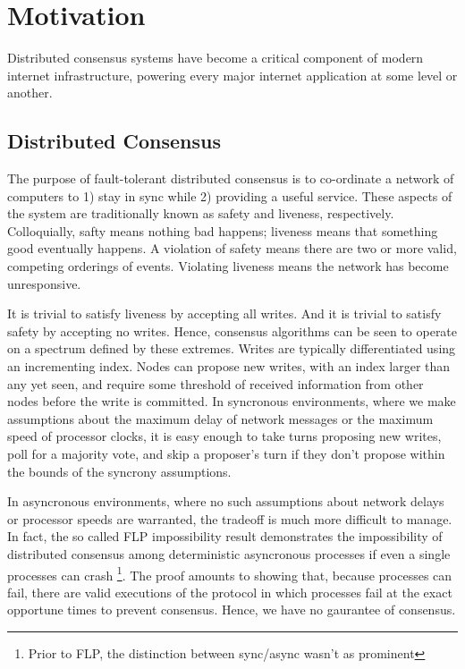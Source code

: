 \chapter{Motivation}

Distributed consensus systems have become a critical component of modern internet infrastructure, powering every major internet application at some level or another.

\section{Distributed Consensus}

The purpose of fault-tolerant distributed consensus is to co-ordinate a network of computers to 1) stay in sync while 2) providing a useful service.
These aspects of the system are traditionally known as safety and liveness, respectively.
Colloquially, safty means nothing bad happens; liveness means that something good eventually happens.
A violation of safety means there are two or more valid, competing orderings of events.
Violating liveness means the network has become unresponsive.

It is trivial to satisfy liveness by accepting all writes. And it is trivial to satisfy safety by accepting no writes.
Hence, consensus algorithms can be seen to operate on a spectrum defined by these extremes.
Writes are typically differentiated using an incrementing index.
Nodes can propose new writes, with an index larger than any yet seen,
and require some threshold of received information from other nodes before the write is committed.
In syncronous environments, where we make assumptions about the maximum delay of network messages or the maximum speed of processor clocks,
 it is easy enough to take turns proposing new writes, poll for a majority vote, 
and skip a proposer's turn if they don't propose within the bounds of the syncrony assumptions.

In asyncronous environments, where no such assumptions about network delays or processor speeds are warranted,
the tradeoff is much more difficult to manage.
In fact, the so called FLP impossibility result demonstrates the impossibility of distributed consensus among deterministic asyncronous processes if even a single processes can crash 
\footnote{Prior to FLP, the distinction between sync/async wasn't as prominent}.
The proof amounts to showing that, because processes can fail, 
there are valid executions of the protocol in which processes fail at the exact opportune times to prevent consensus.
Hence, we have no gaurantee of consensus.

